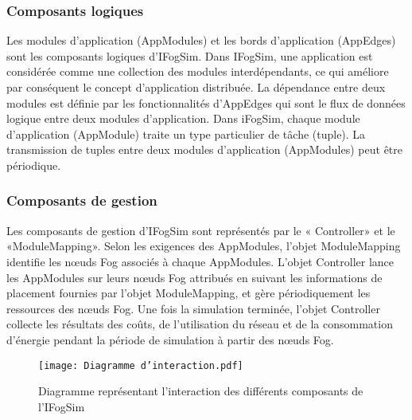\subsubsection{Composants logiques}
Les modules d'application (AppModules) et les bords d'application (AppEdges) sont les composants logiques d'IFogSim. Dans IFogSim, une application est considérée comme une collection des modules interdépendants, ce qui améliore par conséquent le concept d'application distribuée. La dépendance entre deux modules est définie par les fonctionnalités d'AppEdges qui sont le flux de données logique entre deux modules d'application. Dans iFogSim, chaque module d'application (AppModule) traite un type particulier de tâche (tuple). La transmission de tuples entre deux modules d'application (AppModules) peut être périodique.

\subsubsection{Composants de gestion}
Les composants de gestion d'IFogSim sont représentés par le « Controller» et le «ModuleMapping». Selon les exigences des AppModules, l'objet ModuleMapping identifie les nœuds Fog associés à chaque AppModules. L'objet Controller lance les AppModules sur leurs nœuds Fog attribués en suivant les informations de placement fournies par l'objet ModuleMapping, et gère périodiquement les ressources des nœuds Fog. Une fois la simulation terminée, l'objet Controller collecte les résultats des coûts, de l'utilisation du réseau et de la consommation d'énergie pendant la période de simulation à partir des nœuds Fog.
\begin{figure}[H]
    \centering
    \texttt{[image: Diagramme d'interaction.pdf]}
    \caption{Diagramme représentant l'interaction des différents composants de l'IFogSim}
\end{figure}

